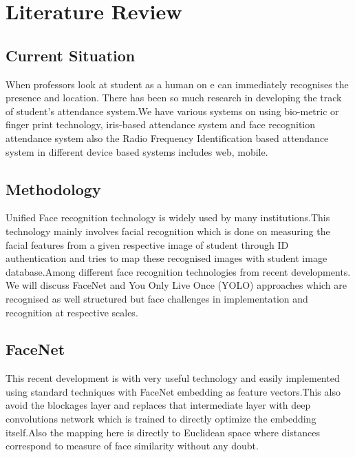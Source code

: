 \documentclass[conference]{IEEEtran}
\begin{document}
\section{Literature Review}

\subsection{Current Situation}
When professors look at student as a human on e can immediately recognises the presence and location. There has been so much research in developing the track of student's attendance system.We have various systems on using bio-metric or finger print technology, iris-based attendance system and face recognition attendance system also the Radio Frequency Identification based attendance system in different device based systems includes web, mobile.

\subsection{Methodology}
Unified Face recognition technology is widely used by many institutions.This technology mainly involves facial recognition which is done on measuring the facial features from a given respective image of student through ID authentication and tries to map these recognised images with student image database.Among different face recognition technologies from recent developments. We will discuss FaceNet and You Only Live Once (YOLO) approaches which are recognised as well structured but face challenges in implementation and recognition at respective scales.

\subsection{FaceNet}
This recent development is with very useful technology and easily implemented using standard techniques with FaceNet embedding as feature vectors.This also avoid the blockages layer and replaces that intermediate layer with deep convolutions network which is trained to directly optimize the embedding itself.Also the mapping here is directly to Euclidean space where  distances correspond to measure of face similarity without any doubt.
\end{document}
